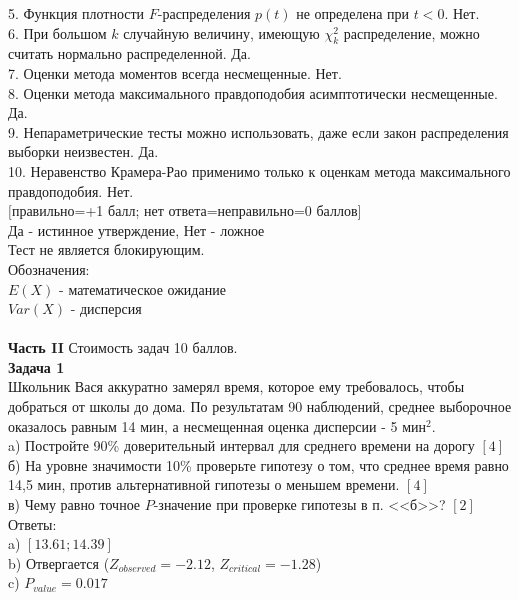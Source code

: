\documentclass[pdftex,12pt,a4paper]{article}
\begin{document}
5. Функция плотности $F$-распределения $p(t)$ не определена при $t<0$.  Нет. \\

6. При большом $k$ случайную величину, имеющую $\chi_{k}^{2}$ распределение, можно считать нормально распределенной. Да.  \\

7. Оценки метода моментов всегда несмещенные.  Нет. \\

8. Оценки метода максимального правдоподобия асимптотически несмещенные. Да.  \\

9. Непараметрические тесты можно использовать, даже если закон распределения выборки неизвестен. Да.  \\

10. Неравенство Крамера-Рао применимо только к оценкам метода максимального правдоподобия. Нет. \\



$[$правильно=+1 балл; нет ответа=неправильно=0 баллов$]$ \\
Да - истинное утверждение, Нет - ложное \\
Тест не является блокирующим. \\
Обозначения: \\
$E(X)$ - математическое ожидание \\
$Var(X)$ - дисперсия \\ \\

\textbf{Часть II} Стоимость задач 10 баллов. \\

\textbf{Задача 1} \\ 
Школьник Вася аккуратно замерял время, которое ему требовалось, чтобы добраться от школы до дома. По результатам 90 наблюдений, среднее выборочное оказалось равным 14 мин, а несмещенная оценка дисперсии - 5 мин$^{2}$. \\
a) Постройте 90\% доверительный интервал для среднего времени на дорогу $[4]$ \\
б) На уровне значимости 10\% проверьте гипотезу о том, что среднее время равно 14,5 мин, против альтернативной гипотезы о меньшем времени. $[4]$ \\
в) Чему равно точное $P$-значение при проверке гипотезы в п. <<б>>? $[2]$ \\
Ответы: \\
a) $[13.61;14.39]$ \\
b) Отвергается ($Z_{observed}=-2.12$, $Z_{critical}=-1.28$) \\
c) $P_{value}=0.017$ \\
\end{document}
